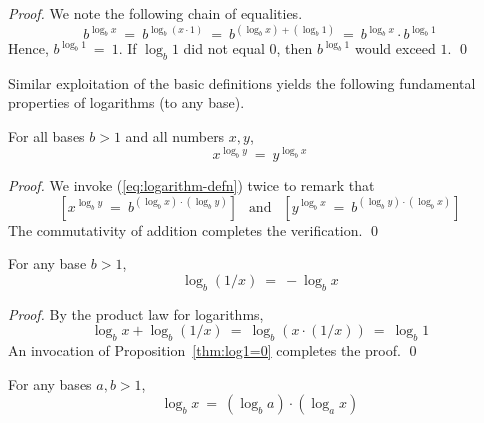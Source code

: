 \begin{proof}
We note the following chain of equalities.
\[  b^{\log_b x} \ = \ b^{\log_b (x \cdot 1)} 
  \ = \ b^{(\log_b x) + (\log_b 1)} 
  \ = \ b^{\log_b x} \cdot b^{\log_b 1}
\]
Hence, $b^{\log_b 1} \ = \ 1$.  If $\log_b 1$ did not equal $0$, then $b^{\log_b 1}$ would exceed $1$.  \qed
\end{proof}

Similar exploitation of the basic definitions yields the following fundamental properties of logarithms (to any base).

\begin{prop}
For all bases $b > 1$ and all numbers $x, y$,
\[ x^{\log_b y} \ = \ y^{\log_b x} \]
\end{prop}

\begin{proof}
We invoke (\ref{eq:logarithm-defn}) twice to remark that
\[ \left[x^{\log_b y} \ = \ b^{(\log_b x) \cdot (\log_b y)}\right]
\ \ \mbox{ and } \ \ 
\left[y^{\log_b x}\ = \ b^{(\log_b y) \cdot (\log_b x)}\right] \]
The commutativity of addition completes the verification.  \qed
\end{proof}

\smallskip

\begin{prop}
For any base $b >1$,
\[ \log_b (1/x) \ = \ - \log_b x \]
\end{prop}

\begin{proof}
By the product law for logarithms,
\[ \log_b x + \log_b (1/x) \ = \ \log_b (x \cdot (1/x))
\  = \ \log_b 1
\]
An invocation of Proposition~\ref{thm:log1=0} completes the proof.  \qed
\end{proof}

\smallskip

\begin{prop}
For any bases $a, b >1$,
\begin{equation}
\label{eq:log-exp-0}
\log_b x \ = \ \left(\log_b a \right) \cdot \left( \log_a x \right)
\end{equation}
\end{prop}

